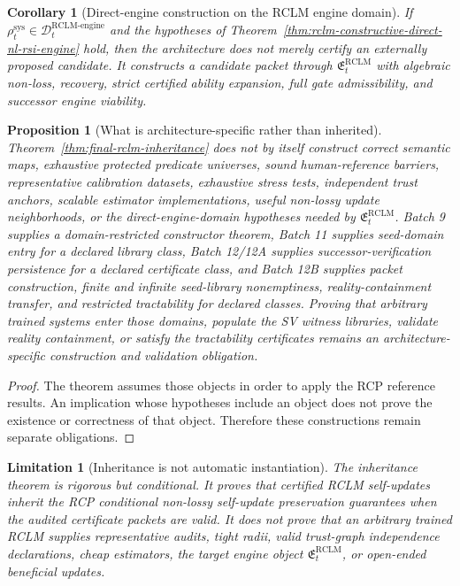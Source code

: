 \documentclass[11pt,a4paper]{article}
\newtheorem{proposition}[theorem]{Proposition}
\newtheorem{corollary}[theorem]{Corollary}
\newtheorem{limitation}[theorem]{Limitation}
\newcommand{\Dcal}{\mathcal D}
\newcommand{\RCLM}{\mathrm{RCLM}}
\newcommand{\sys}{\mathrm{sys}}
\newcommand{\engine}{\mathrm{engine}}
\begin{document}
\begin{corollary}[Direct-engine construction on the RCLM engine domain]
\label{cor:rclm-direct-engine-main-corollary}
If \(\rho_t^{\sys}\in\Dcal_t^{\RCLM\text{-}\engine}\) and the hypotheses of Theorem~\ref{thm:rclm-constructive-direct-nl-rsi-engine} hold, then the architecture does not merely certify an externally proposed candidate. It constructs a candidate packet through \(\mathfrak E_t^{\RCLM}\) with algebraic non-loss, recovery, strict certified ability expansion, full gate admissibility, and successor engine viability.
\end{corollary}

\begin{proposition}[What is architecture-specific rather than inherited]
\label{prop:architecture-specific-work}
Theorem~\ref{thm:final-rclm-inheritance} does not by itself construct correct semantic maps, exhaustive protected predicate universes, sound human-reference barriers, representative calibration datasets, exhaustive stress tests, independent trust anchors, scalable estimator implementations, useful non-lossy update neighborhoods, or the direct-engine-domain hypotheses needed by \(\mathfrak E_t^{\RCLM}\).  Batch 9 supplies a domain-restricted constructor theorem, Batch 11 supplies seed-domain entry for a declared library class, Batch 12/12A supplies successor-verification persistence for a declared certificate class, and Batch 12B supplies packet construction, finite and infinite seed-library nonemptiness, reality-containment transfer, and restricted tractability for declared classes. Proving that arbitrary trained systems enter those domains, populate the SV witness libraries, validate reality containment, or satisfy the tractability certificates remains an architecture-specific construction and validation obligation.
\end{proposition}

\begin{proof}
The theorem assumes those objects in order to apply the RCP reference results.  An implication whose hypotheses include an object does not prove the existence or correctness of that object.  Therefore these constructions remain separate obligations.
\end{proof}

\begin{limitation}[Inheritance is not automatic instantiation]
The inheritance theorem is rigorous but conditional.  It proves that certified RCLM self-updates inherit the RCP conditional non-lossy self-update preservation guarantees when the audited certificate packets are valid.  It does not prove that an arbitrary trained RCLM supplies representative audits, tight radii, valid trust-graph independence declarations, cheap estimators, the target engine object \(\mathfrak E_t^{\RCLM}\), or open-ended beneficial updates.
\end{limitation}
\end{document}
